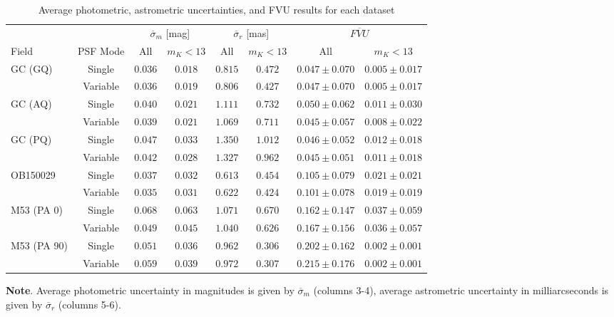 \documentclass[]{spie}  %
\begin{document}
\begin{table}[!h]
\caption{Average photometric, astrometric uncertainties, and FVU results for each dataset}
\setlength{\tabcolsep}{7.0pt}
\begin{center}
\begin{tabular}{lccccccc}
    \hline\hline
    {} & {} & \multicolumn{2}{c}{$\overline{\sigma}_{m}$ [mag]} & \multicolumn{2}{c}{$\overline{\sigma}_{r}$ [mas]} & \multicolumn{2}{c}{$\overline{FVU}$}\\
    \cmidrule(lr){3-4}\cmidrule(l){5-6}\cmidrule(l){7-8}
        Field & PSF Mode & All & $m_{K} < 13$ & All & $m_{K} < 13$ & All & $m_{K} < 13$\\
        \hline
        \multirow{1}{*}{GC (GQ)} & Single & $0.036$ & $0.018$ & $0.815$ & $0.472$ & $0.047 \pm 0.070$ & $0.005 \pm 0.017$\\
        {} & Variable & $0.036$ & $0.019$ & $0.806$ &$0.427$ & $0.047 \pm 0.070$ & $0.005 \pm 0.017$\\
        \hline
        \multirow{1}{*}{GC (AQ)} & Single & $0.040$ & $0.021$ & $1.111$ & $0.732$ & $0.050 \pm 0.062$ & $0.011 \pm 0.030$\\
        {} & Variable & $0.039$ & $0.021$ & $1.069$ & $0.711$ & $0.045 \pm 0.057$ & $0.008 \pm 0.022$\\
        \hline
        \multirow{1}{*}{GC (PQ)} & Single & $0.047$ & $0.033$ & $1.350$ & $1.012$ & $0.046 \pm 0.052$ & $0.012 \pm 0.018$\\
        {} & Variable & $0.042$ & $0.028$ & $1.327$ & $0.962$ & $0.045 \pm 0.051$ & $0.011 \pm 0.018$\\
        \hline
        \multirow{1}{*}{OB150029} & Single & $0.037$ & $0.032$ & $0.613$ & $0.454$ & $0.105 \pm 0.079$ & $0.021 \pm 0.021$\\
        {} & Variable & $0.035$ & $0.031$ & $0.622$ & $0.424$ & $0.101 \pm 0.078$ & $0.019 \pm 0.019$\\
        \hline
        \multirow{1}{*}{M53 (PA 0)} & Single & $0.068$ &  $0.063$ & $1.071$ & $0.670$ & $0.162 \pm 0.147$ & $0.037 \pm 0.059$\\
        {} & Variable & $0.049$ &  $0.045$ & $1.040$ & $0.626$ & $0.167 \pm 0.156$ & $0.036 \pm 0.057$\\
        \hline
        \multirow{1}{*}{M53 (PA 90)} & Single & $0.051$ & $0.036$ & $0.962$ & $0.306$ & $0.202 \pm 0.162$ & $0.002 \pm 0.001$\\
        {} & Variable & $0.059$ & $0.039$ & $0.972$ & $0.307$ & $0.215 \pm 0.176$ & $0.002 \pm 0.001$\\\hline
\end{tabular}
\end{center}
{\raggedright \footnotesize{\textbf{Note}. Average photometric uncertainty in magnitudes is given by $\overline{\sigma}_{m}$ (columns 3-4), average astrometric uncertainty in milliarcseconds is given by $\overline{\sigma}_{r}$ (columns 5-6).}\par}
\label{tab:PhotAstromFVU-results}
\end{table}
\end{document}
